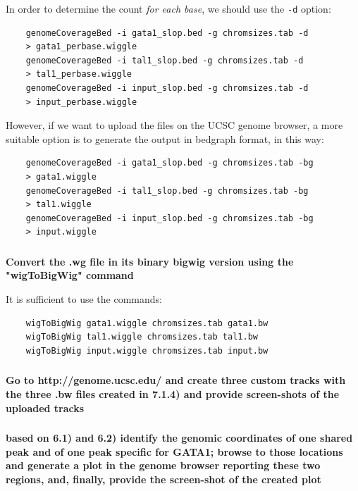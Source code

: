 \documentclass[12pt, a4paper]{article}
\begin{document}
	In order to determine the count \textit{for each base}, we should use the \verb|-d| option:
	
	\begin{verbatim}
	genomeCoverageBed -i gata1_slop.bed -g chromsizes.tab -d
	> gata1_perbase.wiggle
	genomeCoverageBed -i tal1_slop.bed -g chromsizes.tab -d
	> tal1_perbase.wiggle
	genomeCoverageBed -i input_slop.bed -g chromsizes.tab -d
	> input_perbase.wiggle
	\end{verbatim}
	
	However, if we want to upload the files on the UCSC genome browser, a more suitable option is to generate the output in bedgraph format, in this way:
	
	\begin{verbatim}
	genomeCoverageBed -i gata1_slop.bed -g chromsizes.tab -bg
	> gata1.wiggle
	genomeCoverageBed -i tal1_slop.bed -g chromsizes.tab -bg
	> tal1.wiggle
	genomeCoverageBed -i input_slop.bed -g chromsizes.tab -bg
	> input.wiggle
	\end{verbatim}
	
	\subsubsection{}
	\textbf{Convert the .wg file in its binary bigwig version using the "wigToBigWig" command}
	
	It is sufficient to use the commands:
	
	\begin{verbatim}
	wigToBigWig gata1.wiggle chromsizes.tab gata1.bw
	wigToBigWig tal1.wiggle chromsizes.tab tal1.bw
	wigToBigWig input.wiggle chromsizes.tab input.bw
	\end{verbatim}
	
	\subsubsection{}
	\textbf{Go to http://genome.ucsc.edu/ and create three custom tracks with the three .bw files created in 7.1.4) and provide screen-shots of the uploaded tracks}
	
	\subsubsection{}
	\textbf{based on 6.1) and 6.2) identify the genomic coordinates of one shared peak and of one peak specific for GATA1; browse to those locations and generate a plot in the genome browser reporting these two regions, and, finally, provide the screen-shot of the created plot}
	
\end{document}
